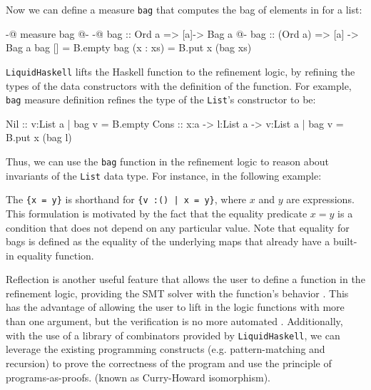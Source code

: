 Now we can define a measure \texttt{bag} that computes the bag of elements in for a list:
\begin{code}

	{-@ measure bag @-}
	{-@ bag :: Ord a => [a]-> Bag a @-}
	bag :: (Ord a) => [a] -> Bag a
	bag [] = B.empty
	bag (x : xs) = B.put x (bag xs)
\end{code}

\texttt{LiquidHaskell} lifts the Haskell function to the refinement logic, by refining the types of the data constructors with the
definition of the function\cite{niki_lecture_2024}.
For example, \texttt{bag} measure definition refines the type of the \texttt{List}'s constructor to be:
\begin{code}
	Nil  :: {v:List a | bag v = B.empty}
	Cons :: x:a -> l:List a -> {v:List a | bag v = B.put x (bag l)}
\end{code}

Thus, we can use the \texttt{bag} function in the refinement logic to reason about
invariants of the \texttt{List} data type. For instance, in the following example:

The \texttt{\{x = y\}} is shorthand for \texttt{\{v :() | x = y\}}, where $x$ and $y$ are expressions.
This formulation is motivated by the fact that the equality predicate $x = y$ is a condition that does not depend on any particular value.
Note that equality for bags is defined as the equality of the underlying maps that already have a built-in equality function.


Reflection is another useful feature that allows the user to define a function in the refinement logic, providing
the SMT solver with the function's behavior \cite{vazou2018}.
This has the advantage of allowing the user to lift in the logic functions with more than one argument, but the verification
is no more automated \cite{niki_lecture_2024}.
Additionally, with the use of a library of combinators provided by \texttt{LiquidHaskell}, we can leverage
the existing programming constructs (e.g. pattern-matching and recursion) to prove the correctness of the
program and use the principle of programs-as-proofs.
(known as Curry-Howard isomorphism)\cite{vazou2018, wadler_propositions_2015}.

